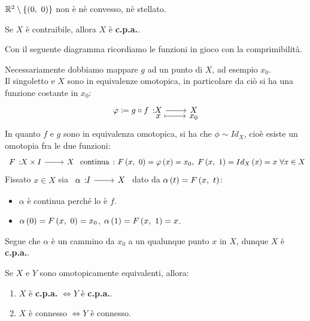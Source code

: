 \begin{example}
$\realset^2\setminus\left\{\left(0,\ 0\right)\right\}$ non è nè convesso, nè stellato.
\end{example}
\begin{lemming}
Se $X$ è contraibile, allora $X$ è \textbf{c.p.a.}.
\end{lemming}
\begin{demonstration} Con il seguente diagramma ricordiamo le funzioni in gioco con la comprimibilità.
\begin{center}
\end{center}
Necessariamente dobbiamo mappare $g$ ad un punto di $X$, ad esempio $x_0$.  \\
Il singoletto e $X$ sono in equivalenze omotopica, in particolare da ciò si ha una funzione costante in $x_0$:
\begin{equation*}
	\funztot{\phi\coloneqq g\circ f}{X}{X}{x}{x_0}
\end{equation*}
In quanto $f$ e $g$ sono in equivalenza omotopica, si ha che $\phi\sim Id_X$, cioè esiste un omotopia fra le due funzioni:
\begin{equation*}
	\funz{F}{X\times I}{X}\text{ continua}\ \colon \mvf{F}{x}{0}=\phi\left(x\right)=x_0,\ \mvf{F}{x}{1}=Id_X\left(x\right)=x\ \forall x\in X
\end{equation*}
Fissato $x\in X$ sia $\funz{\alpha}{I}{X}$ dato da $\alpha\left(t\right)=F\left(x,\ t\right)$:
\begin{itemize}
	\item $\alpha$ è continua perché lo è $f$.
	\item $\alpha\left(0\right)=F\left(x,\ 0\right)=x_0$, $\alpha\left(1\right)=F\left(x,\ 1\right)=x$.
\end{itemize}
Segue che $\alpha$ è un cammino da $x_0$ a un qualunque punto $x$ in $X$, dunque $X$ è \textbf{c.p.a.}.
\end{demonstration}
\begin{exercise}
Se $X$ e $Y$ sono omotopicamente equivalenti, allora:
\begin{enumerate}
\item $X$ è \textbf{c.p.a.} $\iff Y$ è \textbf{c.p.a.}.
\item $X$ è connesso $\iff Y$ è connesso.
\end{enumerate}
\end{exercise}
